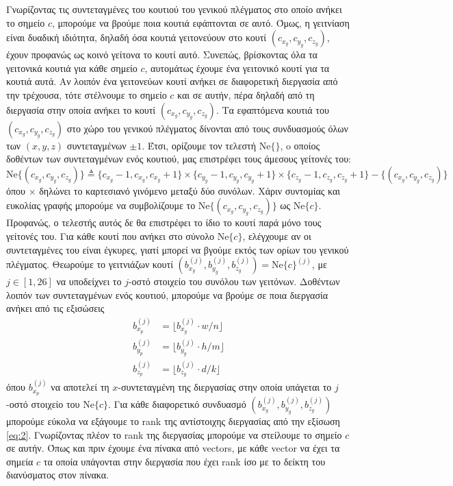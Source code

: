 \documentclass[11pt,a4paper,titlepage]{article}
\begin{document}
 	Γνωρίζοντας τις συντεταγμένες του κουτιού του γενικού πλέγματος στο οποίο ανήκει το σημείο $c$, μπορούμε να βρούμε ποια κουτιά εφάπτονται σε αυτό. Όμως, η γειτνίαση είναι δυαδική ιδιότητα, δηλαδή όσα κουτιά γειτονεύουν στο κουτί $(c_{x_g}, c_{y_g}, c_{z_g})$, έχουν προφανώς ως κοινό γείτονα το κουτί αυτό. Συνεπώς, βρίσκοντας όλα τα γειτονικά κουτιά για κάθε σημείο $c$, αυτομάτως έχουμε ένα γειτονικό κουτί για τα κουτιά αυτά. Αν λοιπόν ένα γειτονεύων κουτί ανήκει σε διαφορετική διεργασία από την τρέχουσα, τότε στέλνουμε το σημείο $c$ και σε αυτήν, πέρα δηλαδή από τη διεργασία στην οποία ανήκει το κουτί $(c_{x_g}, c_{y_g}, c_{z_g})$. Τα εφαπτόμενα κουτιά του $(c_{x_g}, c_{y_g}, c_{z_g})$ στο χώρο του γενικού πλέγματος δίνονται από τους συνδυασμούς όλων των $(x,y,z)$ συντεταγμένων $\pm 1$. Έτσι, ορίζουμε τον τελεστή $\mathrm{Ne}\{\}$, o οποίος δοθέντων των συντεταγμένων ενός κουτιού, μας επιστρέφει τους άμεσους γείτονές του:
	\begin{equation}
		\mathrm{Ne}\{ (c_{x_g}, c_{y_g}, c_{z_g}) \} \triangleq \{c_{x_g} - 1, c_{x_g}, c_{x_g} + 1\} \times \{c_{y_g} - 1, c_{y_g}, c_{y_g} + 1\} \times \{c_{z_g} - 1, c_{z_g}, c_{z_g} + 1\} - \{(c_{x_g}, c_{y_g}, c_{z_g})\}
	\end{equation}
 	όπου $\times$ δηλώνει το καρτεσιανό γινόμενο μεταξύ δύο συνόλων. Χάριν συντομίας και ευκολίας γραφής μπορούμε να συμβολίζουμε το $\mathrm{Ne}\{ (c_{x_g}, c_{y_g}, c_{z_g}) \}$ ως $\mathrm{Ne}\{c\}$. 	
 	Προφανώς, ο τελεστής αυτός δε θα επιστρέφει το ίδιο το κουτί παρά μόνο τους γείτονές του. Για κάθε κουτί που ανήκει στο σύνολο  $\mathrm{Ne}\{c\}$, ελέγχουμε αν οι συντεταγμένες του είναι έγκυρες, γιατί μπορεί να βγούμε εκτός των ορίων του γενικού πλέγματος. Θεωρούμε το γειτνιάζων κουτί $(b_{x_g}^{(j)}, b_{y_g}^{(j)}, b_{z_g}^{(j)}) = \mathrm{Ne}\{c\}^{(j)}$, με $j \in \left[1, 26\right]$ να υποδείχνει το $j$-οστό στοιχείο του  συνόλου των γειτόνων. Δοθέντων λοιπόν των συντεταγμένων ενός κουτιού, μπορούμε να βρούμε σε ποια διεργασία ανήκει από τις εξισώσεις
 	\begin{align}
	 	b_{x_p}^{(j)} &= \lfloor b_{x_g}^{(j)} \cdot w/n \rfloor\\
	 	b_{y_p}^{(j)} &= \lfloor b_{y_g}^{(j)} \cdot h/m \rfloor\\
	 	b_{z_p}^{(j)} &= \lfloor b_{z_g}^{(j)} \cdot d/k \rfloor
 	\end{align}
 	όπου $b_{x_p}^{(j)}$ να αποτελεί τη $x$-συντεταγμένη της διεργασίας στην οποία υπάγεται το $j$-οστό στοιχείο του $\mathrm{Ne}\{c\}$. Για κάθε διαφορετικό συνδυασμό $(b_{x_g}^{(j)}, b_{y_g}^{(j)}, b_{z_g}^{(j)})$ μπορούμε εύκολα να εξάγουμε το rank της αντίστοιχης διεργασίας από την εξίσωση \eqref{eq:2}. Γνωρίζοντας πλέον το rank της διεργασίας μπορούμε να στείλουμε το σημείο $c$ σε αυτήν. Όπως και πριν έχουμε ένα πίνακα από vectors, με κάθε vector να έχει τα σημεία $c$ τα οποία υπάγονται στην διεργασία που έχει rank ίσο με το δείκτη του διανύσματος στον πίνακα.\\
 	
\end{document}
